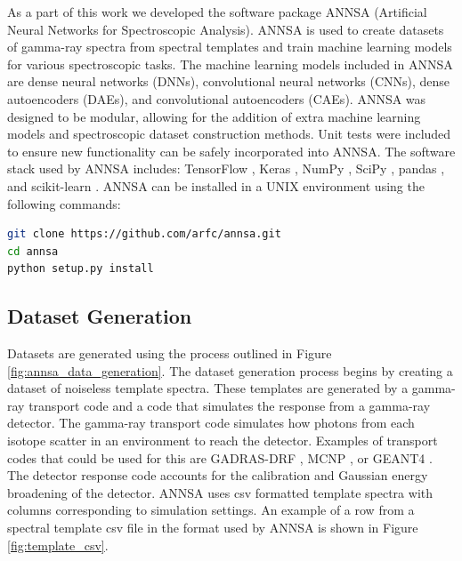 As a part of this work we developed the software package ANNSA (Artificial Neural Networks for Spectroscopic Analysis). ANNSA is used to create datasets of gamma-ray spectra from spectral templates and train machine learning models for various spectroscopic tasks. The machine learning models included in ANNSA are dense neural networks (DNNs), convolutional neural networks (CNNs), dense autoencoders (DAEs), and convolutional autoencoders (CAEs). ANNSA was designed to be modular, allowing for the addition of extra machine learning models and spectroscopic dataset construction methods. Unit tests were included to ensure new functionality can be safely incorporated into ANNSA. The software stack used by ANNSA includes: TensorFlow \cite{tensorflow2015-whitepaper}, Keras \cite{chollet2015keras}, NumPy \cite{numpy}, SciPy \cite{scipy}, pandas \cite{mckinney-proc-scipy-2010}, and scikit-learn \cite{scikit-learn}. ANNSA can be installed in a UNIX environment using the following commands:
\begin{lstlisting}[language=bash, basicstyle={\small\ttfamily}]
git clone https://github.com/arfc/annsa.git
cd annsa
python setup.py install
\end{lstlisting}
\subsection{Dataset Generation}

Datasets are generated using the process outlined in Figure \ref{fig:annsa_data_generation}. The dataset generation process begins by creating a dataset of noiseless template spectra. These templates are generated by a gamma-ray transport code and a code that simulates the response from a gamma-ray detector. The gamma-ray transport code simulates how photons from each isotope scatter in an environment to reach the detector. Examples of transport codes that could be used for this are GADRAS-DRF \cite{mitchell2014}, MCNP \cite{Goorley2016}, or GEANT4 \cite{geant4}. The detector response code accounts for the calibration and Gaussian energy broadening of the detector. ANNSA uses csv formatted template spectra with columns corresponding to simulation settings. An example of a row from a spectral template csv file in the format used by ANNSA is shown in Figure \ref{fig:template_csv}.

